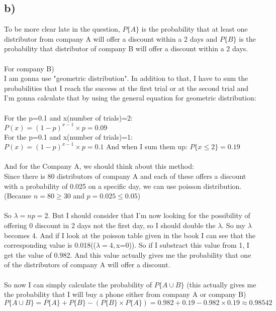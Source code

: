 \documentclass[12pt]{article}
\begin{document}
\subsection*{b)} 
To be more clear late in the question, $P\{A\}$ is the probability that at least one distributor from company A will offer a discount within a 2 days and $P\{B\}$ is the probability that distributor of company B will offer a discount within a 2 days.\\\\
For company B)\\ I am gonna use "geometric distribution". In addition to that, I have to sum the probabilities that I reach the success at the first trial or at the second trial and I'm gonna calculate that by using the general equation for geometric distribution:\\\\
For the p=0.1 and x(number of trials)=2:\\
$P(x) = (1-p)^{x-1}\times p=0.09$\\
For the p=0.1 and x(number of trials)=1:\\
$P(x) = (1-p)^{x-1}\times p=0.1$ And when I sum them up: $P\{x\leq2\}=0.19$\\\\
And for the Company A, we should think about this method:\\
Since there is 80 distributors of company A and each of these offers a discount with a probability of 0.025 on a specific day, we can use poisson distribution.(Because $n=80\geq30$ and $p=0.025\leq0.05$)\\\\
So $\lambda=np=2$. But I should consider that I'm now looking for the possibility of offering 0 discount in 2 days not the first day, so I should double the $\lambda$. So my $\lambda$ becomes 4. And if I look at the poisson table given in the book I can see that the corresponding value is 0.018(($\lambda=4,$x=0)). So if I substract this value from 1, I get the value of 0.982. And this value actually gives me the probability that one of the distributors of company A will offer a discount. \\\\
So now I can simply calculate the probability of $P\{A\cup B\}$ (this actually gives me the probability that I will buy a phone either from company A or company B) $P\{A\cup B\}=P\{A\}+P\{B\}-(P\{ B\}\times P\{A\})=0.982+0.19-0.982\times0.19\approx0.98542$\\\\
\end{document}
